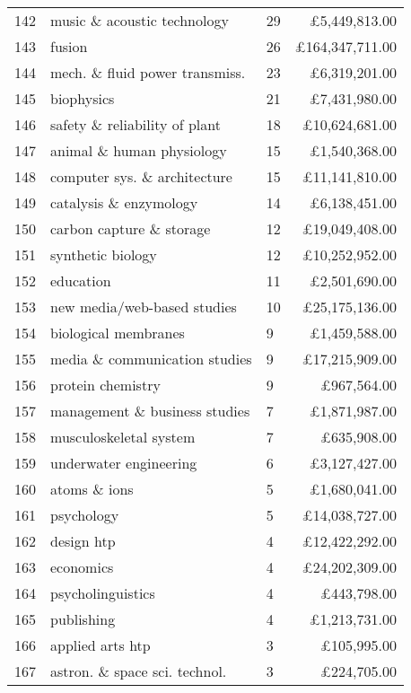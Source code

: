 \begin{spacing}{0.9}
\begin{longtable}[c]{r|>{\raggedleft\arraybackslash}m{6.5cm}|>{\raggedleft\arraybackslash}m{1.9cm}|r}
{142} & {music \& acoustic technology} & {29} & {\pounds5,449,813.00}\\
{143} & {fusion} & {26} & {\pounds164,347,711.00}\\
{144} & {mech. \& fluid power transmiss.} & {23} & {\pounds6,319,201.00}\\
{145} & {biophysics} & {21} & {\pounds7,431,980.00}\\
{146} & {safety \& reliability of plant} & {18} & {\pounds10,624,681.00}\\
{147} & {animal \& human physiology} & {15} & {\pounds1,540,368.00}\\
{148} & {computer sys. \& architecture} & {15} & {\pounds11,141,810.00}\\
{149} & {catalysis \& enzymology} & {14} & {\pounds6,138,451.00}\\
{150} & {carbon capture \& storage} & {12} & {\pounds19,049,408.00}\\
{151} & {synthetic biology} & {12} & {\pounds10,252,952.00}\\
{152} & {education} & {11} & {\pounds2,501,690.00}\\
{153} & {new media/web-based studies} & {10} & {\pounds25,175,136.00}\\
{154} & {biological membranes} & {9} & {\pounds1,459,588.00}\\
{155} & {media \& communication studies} & {9} & {\pounds17,215,909.00}\\
{156} & {protein chemistry} & {9} & {\pounds967,564.00}\\
{157} & {management \& business studies} & {7} & {\pounds1,871,987.00}\\
{158} & {musculoskeletal system} & {7} & {\pounds635,908.00}\\
{159} & {underwater engineering} & {6} & {\pounds3,127,427.00}\\
{160} & {atoms \& ions} & {5} & {\pounds1,680,041.00}\\
{161} & {psychology} & {5} & {\pounds14,038,727.00}\\
{162} & {design htp} & {4} & {\pounds12,422,292.00}\\
{163} & {economics} & {4} & {\pounds24,202,309.00}\\
{164} & {psycholinguistics} & {4} & {\pounds443,798.00}\\
{165} & {publishing} & {4} & {\pounds1,213,731.00}\\
{166} & {applied arts htp} & {3} & {\pounds105,995.00}\\
{167} & {astron. \& space sci. technol.} & {3} & {\pounds224,705.00}\\

\end{longtable}
\end{spacing}
